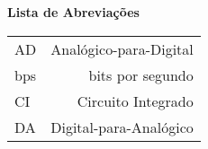 \thispagestyle{empty}
\Huge
\textbf{{Lista de Abreviações}}
\normalsize
\vspace{1cm}

\begin{longtable}{lr}
    AD&\dotfill Analógico-para-Digital\\
    bps	&\dotfill bits por segundo  \\
    CI	&\dotfill Circuito Integrado  \\
    DA	&\dotfill Digital-para-Analógico
\end{longtable}

